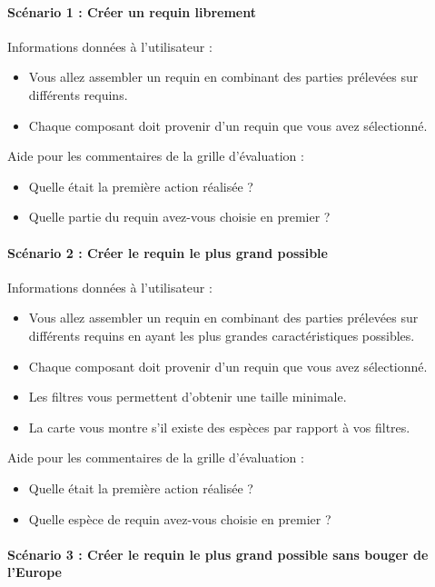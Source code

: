 \documentclass{article}
\begin{document}
\paragraph{Scénario 1 : Créer un requin librement}

Informations données à l'utilisateur :
\begin{itemize}
	\item Vous allez assembler un requin en combinant des parties prélevées sur différents requins.
	\item Chaque composant doit provenir d'un requin que vous avez sélectionné.
\end{itemize}

Aide pour les commentaires de la grille d'évaluation :
\begin{itemize}
	\item Quelle était la première action réalisée ?
	\item Quelle partie du requin avez-vous choisie en premier ?
\end{itemize}

\paragraph{Scénario 2 : Créer le requin le plus grand possible}

Informations données à l'utilisateur :
\begin{itemize}
	\item Vous allez assembler un requin en combinant des parties prélevées sur différents requins en ayant les plus grandes caractéristiques possibles.
	\item Chaque composant doit provenir d'un requin que vous avez sélectionné.
	\item Les filtres vous permettent d'obtenir une taille minimale.
	\item La carte vous montre s'il existe des espèces par rapport à vos filtres.
\end{itemize}

Aide pour les commentaires de la grille d'évaluation :
\begin{itemize}
	\item Quelle était la première action réalisée ?
	\item Quelle espèce de requin avez-vous choisie en premier ?
\end{itemize}

\paragraph{Scénario 3 : Créer le requin le plus grand possible sans bouger de l'Europe}
\end{document}
